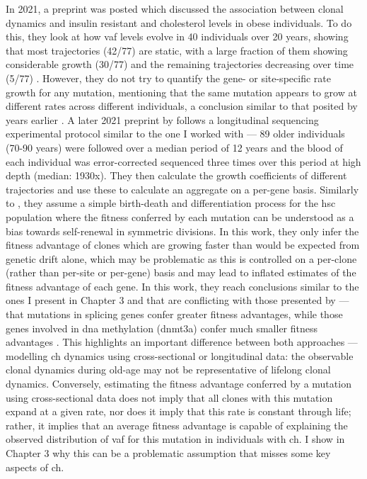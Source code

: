 In 2021, a preprint was posted which discussed the association between clonal dynamics and insulin resistant and cholesterol levels in obese individuals. To do this, they look at how \ac{vaf} levels evolve in 40 individuals over 20 years, showing that most trajectories (42/77) are static, with a large fraction of them showing considerable growth (30/77) and the remaining trajectories decreasing over time (5/77) \cite{Van_Deuren2021-ll}. However, they do not try to quantify the gene- or site-specific rate growth for any mutation, mentioning that the same mutation appears to grow at different rates across different individuals, a conclusion similar to that posited by  years earlier \cite{Young2016-du}. A later 2021 preprint by  follows a longitudinal sequencing experimental protocol similar to the one I worked with --- 89 older individuals (70-90 years) were followed over a median period of 12 years and the blood of each individual was error-corrected sequenced three times over this period at high depth (median: 1930x). They then calculate the growth coefficients of different trajectories and use these to calculate an aggregate on a per-gene basis. Similarly to \cite{Watson2020-pz}, they assume a simple birth-death and differentiation process for the \ac{hsc} population where the fitness conferred by each mutation can be understood as a bias towards self-renewal in symmetric divisions. In this work, they only infer the fitness advantage of clones which are growing faster than would be expected from genetic drift alone, which may be problematic as this is controlled on a per-clone (rather than per-site or per-gene) basis and may lead to inflated estimates of the fitness advantage of each gene. In this work, they reach conclusions similar to the ones I present in Chapter 3 and that are conflicting with those presented by \cite{Watson2020-pz} --- that mutations in splicing genes confer greater fitness advantages, while those genes involved in \ac{dna} methylation (\ac{dnmt3a}) confer much smaller fitness advantages \cite{Robertson2021-sw}. This highlights an important difference between both approaches --- modelling \ac{ch} dynamics using cross-sectional or longitudinal data: the observable clonal dynamics during old-age may not be representative of lifelong clonal dynamics. Conversely, estimating the fitness advantage conferred by a mutation using cross-sectional data does not imply that all clones with this mutation expand at a given rate, nor does it imply that this rate is constant through life; rather, it implies that an average fitness advantage is capable of explaining the observed distribution of \ac{vaf} for this mutation in individuals with \ac{ch}. I show in Chapter 3 why this can be a problematic assumption that misses some key aspects of \ac{ch}.

